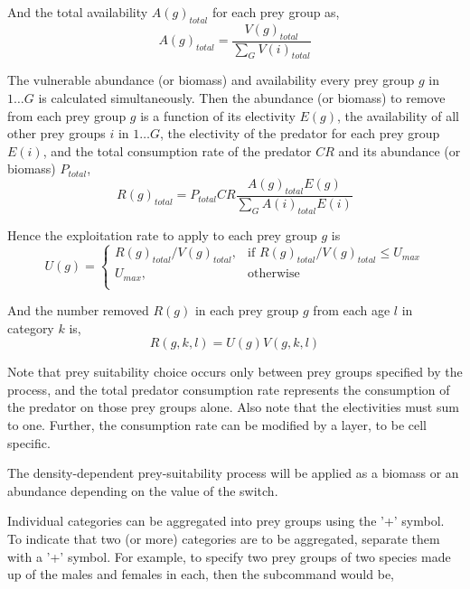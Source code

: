 And the total availability $A(g)_{total}$ for each prey group as,
\begin{equation}
  A(g)_{total} = \frac{V(g)_{total}}{\sum\limits_G {V(i)_{total}}}
\end{equation}

The vulnerable abundance (or biomass) and availability every prey group $g$ in $1 \ldots G$ is calculated simultaneously. Then the abundance (or biomass) to remove from each prey group $g$ is a function of its electivity $E(g)$, the availability of all other prey groups $i$ in $1 \ldots G$, the electivity of the predator for each prey group $E(i)$, and the total consumption rate of the predator $CR$ and its abundance (or biomass) $P_{total}$,
\begin{equation}
  R(g)_{total}=P_{total} CR \frac{A(g)_{total} E(g)}{\sum\limits_G {A(i)_{total} E(i)}}
\end{equation}

Hence the exploitation rate to apply to each prey group $g$ is 
\begin{equation}
U(g) = \begin{cases}
  R(g)_{total}/V(g)_{total}, & \text{if $R(g)_{total}/V(g)_{total} \leq U_{max}$} \\
  U_{max}, & \text{otherwise}\\ 
  \end{cases} 
\end{equation}

And the number removed $R(g)$ in each prey group $g$ from each age $l$ in category $k$ is,
\begin{equation}
  R(g,k,l) = U(g)V(g,k,l)
\end{equation}

Note that prey suitability choice occurs only between prey groups specified by the process, and the total predator consumption rate represents the consumption of the predator on those prey groups alone. Also note that the electivities must sum to one. Further, the consumption rate can be modified by a layer, to be cell specific. 

The density-dependent prey-suitability process will be applied as a biomass or an abundance depending on the value of the  switch.

Individual categories can be aggregated into prey groups using the '+' symbol. To indicate that two (or more) categories are to be aggregated, separate them with a '+' symbol. For example, to specify two prey groups of two species made up of the males and females in each, then the subcommand would be,

